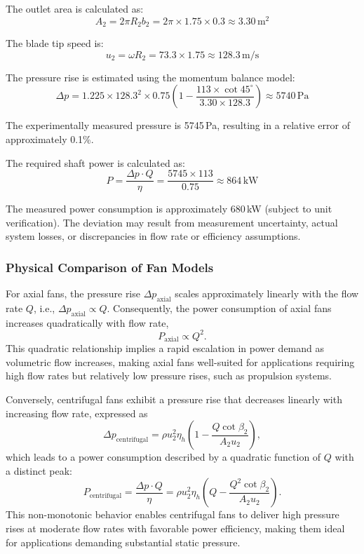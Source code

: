 The outlet area is calculated as:
\begin{equation}
    A_2 = 2 \pi R_2 b_2 = 2 \pi \times 1.75 \times 0.3 \approx 3.30\, \mathrm{m^2}
\end{equation}

The blade tip speed is:
\begin{equation}
    u_2 = \omega R_2 = 73.3 \times 1.75 \approx 128.3\, \mathrm{m/s}
\end{equation}

The pressure rise is estimated using the momentum balance model:
\begin{equation}
    \Delta p 
    = 1.225 \times 128.3^2 \times 0.75 \left(1 - \frac{113 \times \cot 45^\circ}{3.30 \times 128.3} \right) 
    \approx 5740\, \mathrm{Pa}
\end{equation}

The experimentally measured pressure is 5745\,Pa, resulting in a relative error of approximately 0.1\%.

The required shaft power is calculated as:
\begin{equation}
    P = \frac{\Delta p \cdot Q}{\eta} = \frac{5745 \times 113}{0.75} \approx 864\, \mathrm{kW}
\end{equation}

The measured power consumption is approximately 680\,kW (subject to unit verification). The deviation may result from measurement uncertainty, actual system losses, or discrepancies in flow rate or efficiency assumptions.


\subsubsection{Physical Comparison of Fan Models}

For axial fans, the pressure rise \( \Delta p_{\text{axial}} \) scales approximately linearly with the flow rate \( Q \), i.e., \( \Delta p_{\text{axial}} \propto Q \). Consequently, the power consumption of axial fans increases quadratically with flow rate,
\[
    P_{\text{axial}} \propto Q^2.
\]
This quadratic relationship implies a rapid escalation in power demand as volumetric flow increases, making axial fans well-suited for applications requiring high flow rates but relatively low pressure rises, such as propulsion systems.

Conversely, centrifugal fans exhibit a pressure rise that decreases linearly with increasing flow rate, expressed as
\[
    \Delta p_{\text{centrifugal}} = \rho u_2^2 \eta_h \left(1 - \frac{Q \cot \beta_2}{A_2 u_2}\right),
\]
which leads to a power consumption described by a quadratic function of \( Q \) with a distinct peak:
\[
    P_{\text{centrifugal}} = \frac{\Delta p \cdot Q}{\eta} = \rho u_2^2 \eta_h \left(Q - \frac{Q^2 \cot \beta_2}{A_2 u_2}\right).
\]
This non-monotonic behavior enables centrifugal fans to deliver high pressure rises at moderate flow rates with favorable power efficiency, making them ideal for applications demanding substantial static pressure.

